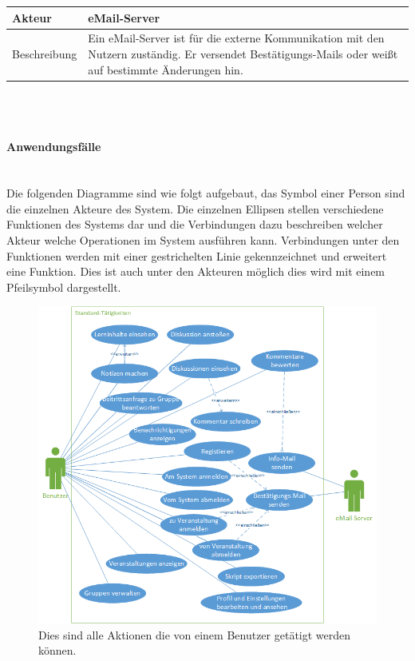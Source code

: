 \documentclass[12pt,a4paper]{article}
\begin{document}
\begin{tabular}{l p{12cm}}
Akteur & \textbf{eMail-Server} \\ 
\hline Beschreibung & Ein eMail-Server ist für die externe Kommunikation mit den Nutzern zuständig. Er versendet Bestätigungs-Mails oder weißt auf bestimmte Änderungen hin. \\ 
\end{tabular}\\\\

\newpage

\paragraph{Anwendungsfälle}\mbox{}\\
Die folgenden Diagramme sind wie folgt aufgebaut, das Symbol einer Person sind die einzelnen Akteure des System. Die einzelnen Ellipsen stellen verschiedene Funktionen des Systems dar und die Verbindungen dazu beschreiben welcher Akteur welche Operationen im System ausführen kann. Verbindungen unter den Funktionen werden mit einer gestrichelten Linie gekennzeichnet und erweitert eine Funktion. Dies ist auch unter den Akteuren möglich dies wird mit einem Pfeilsymbol dargestellt.

\begin{figure}[H]
	\centering
	\includegraphics[width=\textwidth]{Bilder/Anwendungsfalldiagramme/Benutzer.png}
	\caption{Dies sind alle Aktionen die von einem Benutzer getätigt werden können.}
	\label{AwfBenutzer}
\end{figure}
\end{document}
